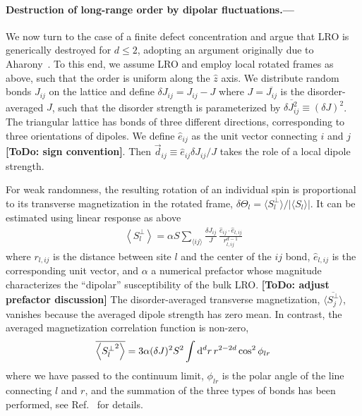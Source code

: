 \documentclass[twocolumn,english,aps,showpacs,prl,floatfix]{revtex4-1}
\newcommand{\todo}[1]{{\color{red} {\bf [ToDo: #1]}}}
\begin{document}
\paragraph{Destruction of long-range order by dipolar fluctuations.---}
%
We now turn to the case of a finite defect concentration and argue that LRO is generically destroyed for $d\leq 2$, adopting an argument originally due to Aharony~\cite{aharony78}. To this end, we assume LRO and employ local rotated frames as above, such that the order is uniform along the $\hat{z}$ axis.
%
We distribute random bonds $J_{ij}$ on the lattice and define $\delta J_{ij}=J_{ij}-J$ where $J=\overline{J_{ij}}$ is the disorder-averaged $J$, such that the disorder strength is parameterized by $\overline{\delta J_{ij}^2} \equiv (\delta J)^2$.
%
The triangular lattice has bonds of three different directions, corresponding to three orientations of dipoles. We define $\hat{e}_{ij}$ as the unit vector connecting $i$ and $j$ \todo{sign convention}. Then $\vec{d}_{ij} \equiv \hat{e}_{ij}\delta J_{ij}/J$ takes the role of a local dipole strength.

For weak randomness, the resulting rotation of an individual spin is proportional to its transverse magnetization in the rotated frame, $\delta\Theta_l = \langle S_{l}^{\perp} \rangle / |\langle S_{l} \rangle|$. It can be estimated using linear response as above
\begin{align}
\left\langle S_{l}^{\perp}\right\rangle = \alpha S
\sum_{\langle ij\rangle} \frac{\delta J_{ij}}{J} \,
\frac{\hat{e}_{ij}\cdot\hat{e}_{l,ij}}{r_{l,ij}^{d-1}}
\end{align}
where $r_{l,ij}$ is the distance between site $l$ and the center of the $ij$ bond, $\hat{e}_{l,ij}$ is the corresponding unit vector, and $\alpha$ a numerical prefactor whose magnitude characterizes the ``dipolar'' susceptibility of the bulk LRO. \todo{adjust prefactor discussion}
%
The disorder-averaged transverse magnetization, $\overline{\langle S_{j}^{\perp}\rangle}$, vanishes because the averaged dipole strength has zero mean. In contrast, the averaged magnetization correlation function is non-zero,
\begin{equation}
\overline{\left\langle {S_{l}^{\perp}}^2\right\rangle } = 3\alpha(\delta J)^{2} S^2 \int{\rm d}^{d}r \,r^{2-2d} \cos^2 \phi_{lr}
\label{fluctint}
\end{equation}
where we have passed to the continuum limit, $\phi_{lr}$ is the polar angle of the line connecting $l$ and $r$, and the summation of the three types of bonds has been performed, see Ref.~ for details.
\end{document}
